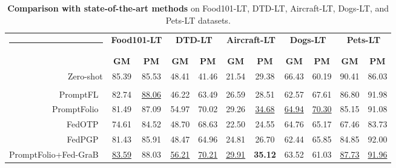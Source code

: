 \documentclass[10pt,twocolumn,letterpaper]{article}
\makeatletter
\newcommand{\thickhline}{%
  \noalign{\ifnum0=`}\fi\hrule height 1pt\relax
  \futurelet\reserved@a\@xhline
}
\makeatother
\begin{document}
\begin{table}[t]
\centering
\caption{\textbf{Comparison with state-of-the-art methods} on Food101-LT, DTD-LT, Aircraft-LT, Dogs-LT, and Pets-LT datasets.}
\vspace{-0.5em}
\footnotesize
\setlength\tabcolsep{3pt}
\renewcommand\arraystretch{1.1}
\begin{tabular}{r||cc|cc|cc|cc|cc}
\hline\thickhline
\rowcolor{gray!20}
\multirow{2}{*}{\textbf{Method}} & \multicolumn{2}{c|}{\textbf{Food101-LT}} & \multicolumn{2}{c|}{\textbf{DTD-LT}} & \multicolumn{2}{c|}{\textbf{Aircraft-LT}} & \multicolumn{2}{c|}{\textbf{Dogs-LT}} & \multicolumn{2}{c}{\textbf{Pets-LT}} \\
\cline{2-11}
\rowcolor{gray!20}
\multirow{-2}{*}{\textbf{Method}}  & \textbf{GM} & \textbf{PM} & \textbf{GM} & \textbf{PM} & \textbf{GM} & \textbf{PM} & \textbf{GM} & \textbf{PM} & \textbf{GM} & \textbf{PM} \\
\hline\hline
Zero-shot & 85.39 & 85.53 & 48.41 & 41.46 & 21.54 & 29.38 & 66.43 & 60.19 & 90.41 & 86.03 \\
\hdashline
\multicolumn{11}{l}{\textcolor{gray!60}{\textit{Prompt-based}}} \\
\cellcolor{gray!10}PromptFL~\cite{guo2023promptfl}
 & \cellcolor{gray!10}82.74 & \cellcolor{gray!10}\underline{88.06} & \cellcolor{gray!10}46.22 & \cellcolor{gray!10}63.49
 & \cellcolor{gray!10}26.59 & \cellcolor{gray!10}28.51 & \cellcolor{gray!10}62.57 & \cellcolor{gray!10}67.61
 & \cellcolor{gray!10}86.80 & \cellcolor{gray!10}91.98 \\

PromptFolio~\cite{pan2024promptfolio}
 & 81.49 & 87.09 & 54.97 & 70.02
 & 29.26 & \underline{34.68} & \underline{64.94} & \underline{70.30}
 & 85.15 & 91.08 \\

\cellcolor{gray!10}FedOTP~\cite{li2024fedotp}
 & \cellcolor{gray!10}74.61 & \cellcolor{gray!10}84.52 & \cellcolor{gray!10}48.70 & \cellcolor{gray!10}68.63
 & \cellcolor{gray!10}22.50 & \cellcolor{gray!10}24.55 & \cellcolor{gray!10}64.76 & \cellcolor{gray!10}65.17
 & \cellcolor{gray!10}67.46 & \cellcolor{gray!10}83.73 \\

FedPGP~\cite{cui2024fedpgp}
 & 81.43 & 85.91 & 48.47 & 64.96
 & 24.81 & 26.70 & 62.44 & 65.85
 & 84.85 & 92.00 \\
\cellcolor{gray!10}
PromptFolio+Fed-GraB~\cite{Fed-Grab}
 & \cellcolor{gray!10}\underline{83.59} & \cellcolor{gray!10}88.03 & \cellcolor{gray!10}\underline{56.21} & \cellcolor{gray!10}\underline{70.21}
 & \cellcolor{gray!10}\underline{29.91} & \cellcolor{gray!10}\textbf{35.12} & \cellcolor{gray!10}63.52 & \cellcolor{gray!10}61.03
 & \cellcolor{gray!10}\underline{87.73} & \cellcolor{gray!10}\underline{91.96} \\


\end{tabular}
\end{table}
\end{document}
